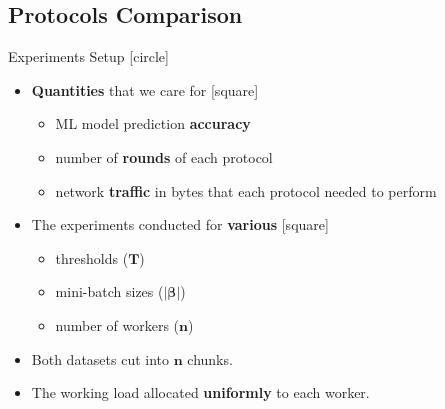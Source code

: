\subsection{Protocols Comparison}\label{subsec:protocols-comparison}

\begin{frame}{Experiments Setup}
    [circle]
    \begin{itemize}
        \item{\textbf{Quantities} that we care for
        [square]
        \begin{itemize}
            \item{ML model prediction \textbf{accuracy}}
            \item{number of \textbf{rounds} of each protocol}
            \item{network \textbf{traffic} in bytes that each protocol needed to perform}
        \end{itemize}
        }
        \vspace{0.2cm}
        \item{The experiments conducted for \textbf{various}
        [square]
        \begin{itemize}
            \item{thresholds ($\pmb{T}$)}
            \item{mini-batch sizes ($\pmb{|\beta|}$)}
            \item{number of workers ($\pmb{n}$)}
        \end{itemize}
        }
        \vspace{0.2cm}
        \item{Both datasets cut into $\pmb{n}$ chunks.}
        \vspace{0.2cm}
        \item{The working load allocated \textbf{uniformly} to each worker.}
    \end{itemize}
\end{frame}

